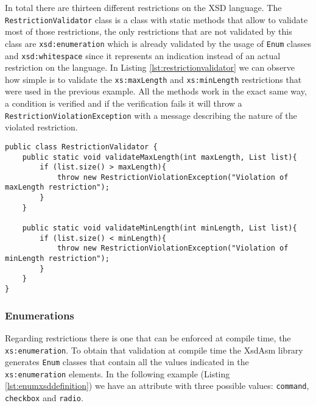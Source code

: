 \noindent
In total there are thirteen different restrictions on the \ac{XSD} language. The \texttt{RestrictionValidator} class is a class with static methods that allow to validate most of those restrictions, the only restrictions that are not validated by this class are \texttt{xsd:enumeration} which is already validated by the usage of \texttt{Enum} classes and \texttt{xsd:whitespace} since it represents an indication instead of an actual restriction on the language. In Listing \ref{lst:restrictionvalidator} we can observe how simple is to validate the \texttt{xs:maxLength} and \texttt{xs:minLength} restrictions that were used in the previous example. All the methods work in the exact same way, a condition is verified and if the verification fails it will throw a \texttt{RestrictionViolationException} with a message describing the nature of the violated restriction.

\bigskip


\begin{minipage}{\linewidth}
\begin{lstlisting}[caption={RestrictionValidator Class - The Validation Methods},label={lst:restrictionvalidator}]
public class RestrictionValidator {
    public static void validateMaxLength(int maxLength, List list){
        if (list.size() > maxLength){
            throw new RestrictionViolationException("Violation of maxLength restriction");
        }
    }
    
    public static void validateMinLength(int minLength, List list){
        if (list.size() < minLength){
            throw new RestrictionViolationException("Violation of minLength restriction");
        }
    }
}
\end{lstlisting}
\end{minipage}

\subsubsection{Enumerations}
\label{sec:enumarations}

Regarding restrictions there is one that can be enforced at compile time, the \texttt{xs:enumeration}. To obtain that validation at compile time the XsdAsm library generates \texttt{Enum} classes that contain all the values indicated in the \texttt{xs:enumeration} elements. In the following example (Listing \ref{lst:enumxsddefinition}) we have an attribute with three possible values: \texttt{command}, \texttt{checkbox} and \texttt{radio}.

